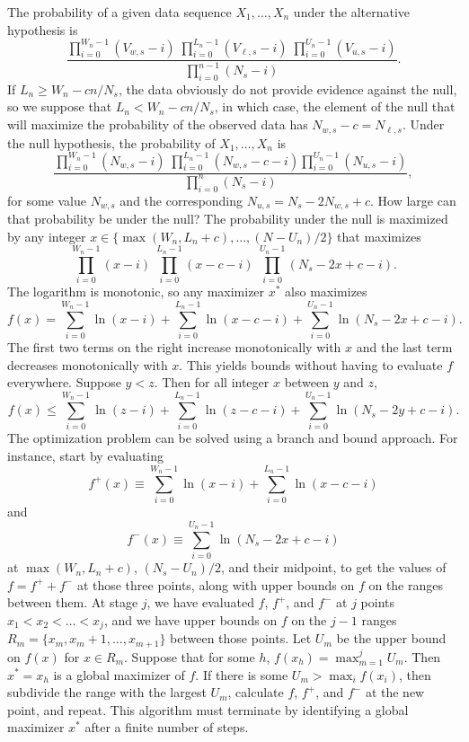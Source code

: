 \documentclass[runningheads]{llncs}
\begin{document}
The probability of a given data sequence $X_1, \ldots, X_n$ under the alternative hypothesis is
$$
    \frac{\prod_{i=0}^{W_n-1} (V_{w,s}-i) \; 
             \prod_{i=0}^{L_n-1} (V_{\ell,s}-i) \;
             \prod_{i=0}^{U_n-1} (V_{u,s}-i)}
            {\prod_{i=0}^{n-1} (N_s-i)}.
$$
If $L_n \ge W_n - cn/N_s$, the data obviously do not provide evidence against the null, so we suppose that
$L_n < W_n - cn/N_s$, in which case, the element of the null that will maximize the probability of the observed data has $N_{w,s} - c = N_{\ell,s}$.
Under the null hypothesis, the probability of $X_1, \ldots, X_n$ is
$$
    \frac{ \prod_{i=0}^{W_n-1} (N_{w,s}-i) \;
             \prod_{i=0}^{L_n-1}(N_{w,s}-c - i)
             \prod_{i=0}^{U_n-1} (N_{u,s}-i)}
             {\prod_{i=0}^n (N_s-i)},
$$
for some value $N_{w,s}$ and the corresponding $N_{u,s} = N_s - 2N_{w,s}+c$.
How large can that probability be under the null? 
The probability under the null is maximized by any integer 
$x \in \{ \max(W_n, L_n+c), \ldots, (N-U_n)/2 \}$ that maximizes 
$$
\prod_{i=0}^{W_n-1} (x-i) \; \prod_{i=0}^{L_n-1} (x-c-i) \; \prod_{i=0}^{U_n-1} (N_s-2x+c - i).
$$
The logarithm is monotonic, so any maximizer $x^*$ also maximizes
$$ f(x) = \sum_{i=0}^{W_n-1} \ln (x-i) + \sum_{i=0}^{L_n-1} \ln (x-c-i) + \sum_{i=0}^{U_n-1} \ln (N_s-2x+ c - i).$$
The first two terms on the right increase monotonically with $x$ and the last term decreases monotonically with $x$.
This yields bounds without having to evaluate $f$ everywhere.
Suppose $y < z$. 
Then for all integer $x$ between $y$ and $z$, 
$$ f(x) \le \sum_{i=0}^{W_n-1} \ln (z-i) + \sum_{i=0}^{L_n-1} \ln (z-c-i) + \sum_{i=0}^{U_n-1} \ln (N_s-2y+c-i).$$
The optimization problem can be solved using a branch and bound approach.
For instance, start by evaluating 
$$
   f^+(x) \equiv \sum_{i=0}^{W_n-1} \ln (x-i) + \sum_{i=0}^{L_n-1} \ln (x-c-i)
$$
and
$$
  f^-(x) \equiv \sum_{i=0}^{U_n-1} \ln (N_s-2x+c-i)
$$
at $\max(W_n, L_n+c)$, $(N_s-U_n)/2$, and their midpoint,
 to get the values of $f = f^+ + f^-$ at those three points, along with 
upper bounds on $f$ on the ranges between them.
At stage $j$, we have evaluated $f$, $f^+$, and $f^-$ at $j$ points $x_1 < x_2 < \ldots < x_j$, and 
we have upper bounds on $f$ on the $j-1$ ranges $R_m = \{x_m, x_m+1, \ldots, x_{m+1}\}$
between those points.
Let $U_m$ be the upper bound on $f(x)$ for $x \in R_m$.
Suppose that for some $h$, $f(x_h) = \max_{m=1}^j U_m$.
Then $x^* = x_h$ is a global maximizer of $f$.
If there is some $U_m > \max_i f(x_i)$, then subdivide the range with the largest $U_m$,
calculate $f$, $f^+$, and $f^-$ at the new point, and repeat.
This algorithm must terminate by identifying a global maximizer $x^*$ after a finite number of steps.
\end{document}
